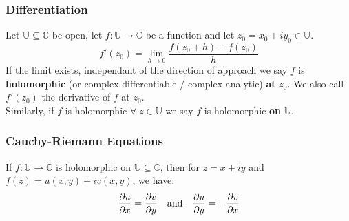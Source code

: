 \documentclass[a4paper, 10pt]{article}
\begin{document}
\subsubsection{Differentiation}
\begin{definitionbox}{}{}
  Let $\mathbb{U} \subseteq \mathbb{C}$ be open, let $f: \mathbb{U} \to \mathbb{C}$ be a function and let $z_0 = x_0 + iy_0 \in \mathbb{U}$.
  $$f'(z_0) = \lim_{h \to 0} \frac{f(z_0 + h) - f(z_0)}{h}$$
  If the limit exists, independant of the direction of approach we say $f$ is \textbf{holomorphic} (or complex differentiable / complex analytic) \textbf{at} $z_0$.
  We also call $f'(z_0)$ the derivative of $f$ at $z_0$. \\
  Similarly, if $f$ is holomorphic $\forall \; z \in \mathbb{U}$ we say $f$ is holomorphic \textbf{on} $\mathbb{U}$.
\end{definitionbox}


\subsubsection{Cauchy-Riemann Equations}
\begin{theorembox}
  If $f:\mathbb{U} \to \mathbb{C}$ is holomorphic on $\mathbb{U} \subseteq \mathbb{C}$, then for $z = x + iy$ and $f(z) = u(x,y) + iv(x,y)$, we have:
  $$\frac{\partial u}{\partial x} = \frac{\partial v}{\partial y} \quad  \text{and} \quad \frac{\partial u}{\partial y} = - \frac{\partial v}{\partial x}$$
\end{theorembox}

\pagebreak
\end{document}

